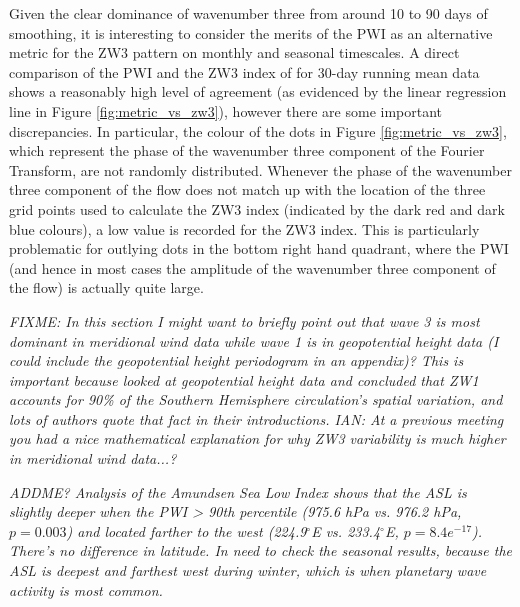 Given the clear dominance of wavenumber three from around 10 to 90 days of smoothing, it is interesting to consider the merits of the PWI as an alternative metric for the ZW3 pattern on monthly and seasonal timescales. A direct comparison of the PWI and the ZW3 index of \citet{Raphael2004} for 30-day running mean data shows a reasonably high level of agreement (as evidenced by the linear regression line in Figure \ref{fig:metric_vs_zw3}), however there are some important discrepancies. In particular, the colour of the dots in Figure \ref{fig:metric_vs_zw3}, which represent the phase of the wavenumber three component of the Fourier Transform, are not randomly distributed. Whenever the phase of the wavenumber three component of the flow does not match up with the location of the three grid points used to calculate the ZW3 index (indicated by the dark red and dark blue colours), a low value is recorded for the ZW3 index. This is particularly problematic for outlying dots in the bottom right hand quadrant, where the PWI (and hence in most cases the amplitude of the wavenumber three component of the flow) is actually quite large.      

\textit{FIXME: In this section I might want to briefly point out that wave 3 is most dominant in meridional wind data while wave 1 is in geopotential height data (I could include the geopotential height periodogram in an appendix)? This is important because \citet{vanLoon1972} looked at geopotential height data and concluded that ZW1 accounts for 90\% of the Southern Hemisphere circulation's spatial variation, and lots of authors quote that fact in their introductions. IAN: At a previous meeting you had a nice mathematical explanation for why ZW3 variability is much higher in meridional wind data...? }

\textit{ADDME? Analysis of the Amundsen Sea Low Index \citep{Turner2013} shows that the ASL is slightly deeper when the PWI > 90th percentile (975.6 hPa vs. 976.2 hPa, $p = 0.003$) and located farther to the west (224.9$^{\circ}$E vs. 233.4$^{\circ}$E, $p = 8.4e^{-17}$). There's no difference in latitude.  In need to check the seasonal results, because the ASL is deepest and farthest west during winter, which is when planetary wave activity is most common.}  